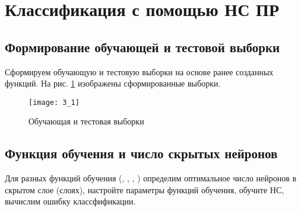 \newpage

\section{Классификация с помощью НС ПР}

\subsection{Формирование обучающей и тестовой выборки}

Сформируем обучающую и тестовую выборки на основе ранее созданных функций. На рис. \ref{fig:3_1} изображены сформированные выборки.
\begin{figure}[H]
\begin{center}
	\texttt{[image: 3\_1]}
	\caption{Обучающая и тестовая выборки}
	\label{fig:3_1}
\end{center}
\end{figure}

\subsection{Функция обучения и число скрытых нейронов}

Для разных функций обучения (, , , ) определим оптимальное число нейронов в скрытом слое (слоях), настройте параметры функций обучения, обучите НС, вычислим ошибку классфификации.

